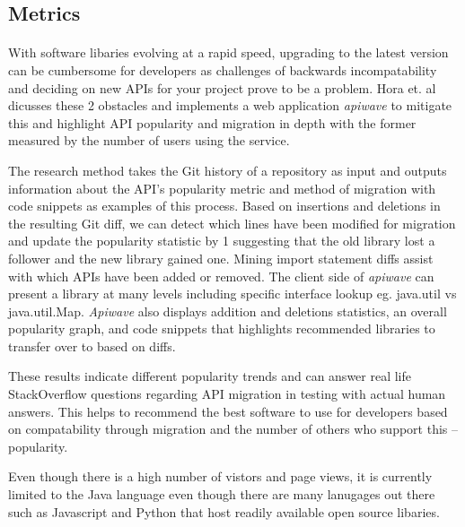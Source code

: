 \documentclass[12pt]{article}
\begin{document}

\subsection{Metrics}
\paragraph{}
With software libaries evolving at a rapid speed, upgrading to the latest version can be cumbersome for developers
as challenges of backwards incompatability and deciding on new APIs for your project prove to be a problem.
Hora et. al \cite{apiwave} dicusses these 2 obstacles and implements a web application \textit{apiwave} \cite{apiwavewebsite} to mitigate this and
highlight API popularity and migration in depth with the former measured by the number of users using the service.

The research method takes the Git history of a repository as input and outputs information about the API's popularity metric 
and method of migration with code snippets as examples of this process.
Based on insertions and deletions in the resulting Git diff, we can detect which lines have been modified for migration 
and update the popularity statistic by 1 suggesting that the old library lost a follower and the new library gained one.
Mining import statement diffs assist with which APIs have been added or removed.
The client side of \textit{apiwave} \cite{apiwavewebsite} can present a library at many levels including specific interface lookup eg. java.util vs java.util.Map.
\textit{Apiwave} also displays addition and deletions statistics, an overall popularity graph, 
and code snippets that highlights recommended libraries to transfer over to based on diffs.

These results indicate different popularity trends and can answer real life StackOverflow \cite{stackoverflow} 
questions regarding API migration in testing with actual human answers. 
This helps to recommend the best software to use for developers based on compatability through migration
and the number of others who support this -- popularity.

Even though there is a high number of vistors and page views, it is currently limited to the Java language even though there are many lanugages out there
such as Javascript and Python that host readily available open source libaries. 
\end{document}
